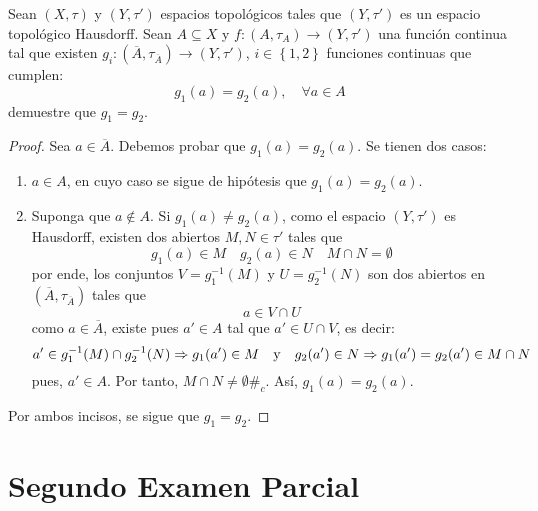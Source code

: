 \documentclass[12pt]{report}
\theoremstyle{largebreak}
\newcommand\cf[3]{\ensuremath{#1:#2\rightarrow#3}}
\newcommand\contradiction{\ensuremath{\#_c}}
\newcommand{\Cls}[1]{\ensuremath{\overline{#1}}}
\begin{document}
    \begin{excer}
        Sean $(X,\tau)$ y $(Y,\tau')$ espacios topológicos tales que $(Y,\tau')$ es un espacio topológico Hausdorff. Sean $A\subseteq X$ y $\cf{f}{(A,\tau_A)}{(Y,\tau')}$ una función continua tal que existen $\cf{g_i}{(\Cls{A},\tau_{\Cls{A}})}{(Y,\tau')}$, $i\in\left\{1,2 \right\}$ funciones continuas que cumplen:
        \begin{equation*}
            g_1(a)=g_2(a),\quad\forall a\in A
        \end{equation*}
        demuestre que $g_1=g_2$.
    \end{excer}

    \begin{proof}
        Sea $a\in\Cls{A}$. Debemos probar que $g_1(a)=g_2(a)$. Se tienen dos casos:
        \begin{enumerate}
            \item $a\in A$, en cuyo caso se sigue de hipótesis que $g_1(a)=g_2(a)$.
            \item Suponga que $a\notin A$. Si $g_1(a)\neq g_2(a)$, como el espacio $(Y,\tau')$ es Hausdorff, existen dos abiertos $M,N\in\tau'$ tales que
            \begin{equation*}
                g_1(a)\in M\quad g_2(a)\in N\quad M\cap N=\emptyset
            \end{equation*}
            por ende, los conjuntos $V=g_1^{-1}(M)$ y $U=g_2^{-1}(N)$ son dos abiertos en $(\Cls{A},\tau_{\Cls{A}})$ tales que
            \begin{equation*}
                a\in V\cap U
            \end{equation*}
            como $a\in\Cls{A}$, existe pues $a'\in A$ tal que $a'\in U\cap V$, es decir:
            \begin{equation*}
                a'\in g_1^{-1}(M)\cap g_2^{-1}(N)\Rightarrow g_1(a')\in M\quad\textup{y}\quad g_2(a')\in N\Rightarrow g_1(a')=g_2(a')\in M\cap N
            \end{equation*}
            pues, $a'\in A$. Por tanto, $M\cap N\neq\emptyset$\contradiction. Así, $g_1(a)=g_2(a)$.
        \end{enumerate}
        Por ambos incisos, se sigue que $g_1=g_2$.
    \end{proof}

    \chapter{Segundo Examen Parcial}
\end{document}
